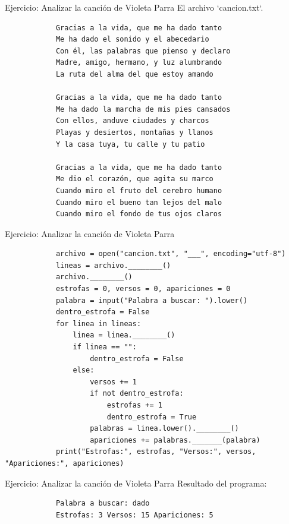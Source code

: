 \documentclass{beamer}
\begin{document}
    \begin{frame}[fragile, t]{Ejercicio: Analizar la canción de Violeta Parra}
        El archivo `cancion.txt`.
        \begin{verbatim}
            Gracias a la vida, que me ha dado tanto
            Me ha dado el sonido y el abecedario
            Con él, las palabras que pienso y declaro
            Madre, amigo, hermano, y luz alumbrando
            La ruta del alma del que estoy amando

            Gracias a la vida, que me ha dado tanto
            Me ha dado la marcha de mis pies cansados
            Con ellos, anduve ciudades y charcos
            Playas y desiertos, montañas y llanos
            Y la casa tuya, tu calle y tu patio

            Gracias a la vida, que me ha dado tanto
            Me dio el corazón, que agita su marco
            Cuando miro el fruto del cerebro humano
            Cuando miro el bueno tan lejos del malo
            Cuando miro el fondo de tus ojos claros
        \end{verbatim}
    \end{frame}

    \begin{frame}[fragile, t]{Ejercicio: Analizar la canción de Violeta Parra}
        \vspace{-0.1cm}
        \begin{verbatim}
            archivo = open("cancion.txt", "___", encoding="utf-8")
            lineas = archivo.________()
            archivo.________()
            estrofas = 0, versos = 0, apariciones = 0
            palabra = input("Palabra a buscar: ").lower()
            dentro_estrofa = False
            for linea in lineas:
                linea = linea.________()
                if linea == "":
                    dentro_estrofa = False
                else:
                    versos += 1
                    if not dentro_estrofa:
                        estrofas += 1
                        dentro_estrofa = True
                    palabras = linea.lower().________()
                    apariciones += palabras._______(palabra)
            print("Estrofas:", estrofas, "Versos:", versos, "Apariciones:", apariciones)
        \end{verbatim}
    \end{frame}

    \begin{frame}[fragile, t]{Ejercicio: Analizar la canción de Violeta Parra}
        Resultado del programa:
        \begin{verbatim}
            Palabra a buscar: dado
            Estrofas: 3 Versos: 15 Apariciones: 5
        \end{verbatim}
    \end{frame}
\end{document}
